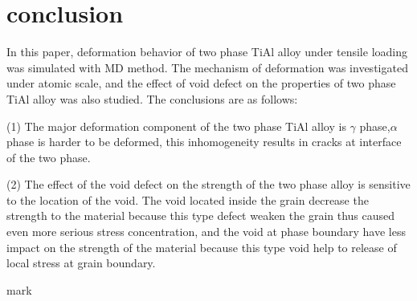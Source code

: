 \documentclass[metals,article,submit,moreauthors,pdftex,10pt,a4paper]{Definitions/mdpi}
\begin{document}
\section{conclusion}
In this paper, deformation behavior of two phase TiAl alloy under tensile loading was simulated with MD method. The mechanism of deformation was investigated under atomic scale, and the effect of void defect on the properties of two phase TiAl alloy was also studied.  The conclusions are as follows:

(1) The major deformation component of the two phase TiAl alloy is $\gamma$ phase,$\alpha$ phase is harder to be deformed, this inhomogeneity results in cracks at interface of the two phase. 

(2) The effect of the void defect on the strength of the two phase alloy is sensitive to the location of the void. The void located inside the grain decrease the strength to the material because this type defect weaken the grain thus caused even more serious stress concentration, and the void at phase boundary have less impact on the strength of the material because this type void help to release of local stress at grain boundary.



mark
\end{document}
